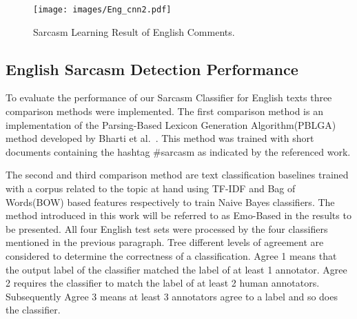\documentclass[12pt,a4paper]{report}
\theoremstyle{definition}
\begin{document}
\begin{CJK}{UTF8}{bsmi}
        \begin{center}
        \begin{figure}[H]
            \texttt{[image: images/Eng\_cnn2.pdf]}
            \caption{Sarcasm Learning Result of English Comments.}
            \label{fig:sar_learning_english}
        \end{figure}
        \end{center}
        \subsection{English Sarcasm Detection Performance}
        \par To evaluate the performance of our Sarcasm
        Classifier for English texts three comparison methods were implemented. The first comparison method is an implementation of the Parsing-Based Lexicon Generation Algorithm(PBLGA) method developed by Bharti et al.~\cite{bharti2015parsing}. This method was trained with short documents containing the hashtag \#sarcasm as indicated by the referenced work.
        \par The second and third comparison method are text classification baselines trained with a corpus related to the topic at hand using TF-IDF and Bag of Words(BOW) based features respectively to train Naive Bayes classifiers. The method introduced in this work will be referred to as Emo-Based in the results to be presented. All four English test sets were processed by the four classifiers mentioned in the previous paragraph. Tree different levels of agreement are considered to determine the correctness of a classification. Agree 1 means that the output label of the classifier matched the label of at least 1 annotator. Agree 2 requires the classifier to match the label of at least 2 human annotators. Subsequently Agree 3 means at least 3 annotators agree to a label and so does the classifier.

\end{CJK}
\end{document}
